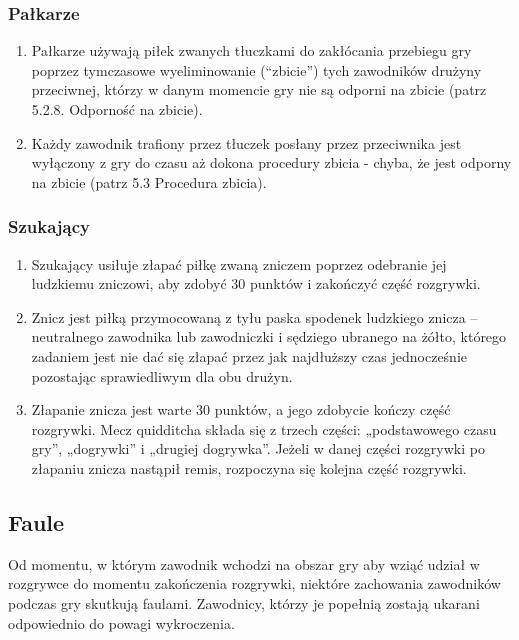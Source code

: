 \documentclass[12pt]{article}
\begin{document}
\subsubsection{Pałkarze}
\begin{enumerate}
	\item Pałkarze używają piłek zwanych tłuczkami do zakłócania przebiegu gry
	      poprzez tymczasowe wyeliminowanie (``zbicie'') tych zawodników drużyny
	      przeciwnej, którzy w danym momencie gry nie są odporni na zbicie (patrz
	      5.2.8. Odporność na zbicie).

	\item Każdy zawodnik trafiony przez tłuczek posłany przez przeciwnika jest
	      wyłączony z gry do czasu aż dokona procedury zbicia - chyba, że jest
	      odporny na zbicie (patrz 5.3 Procedura zbicia).
\end{enumerate}

\subsubsection{Szukający}
\begin{enumerate}
	\item Szukający usiłuje złapać piłkę zwaną zniczem poprzez odebranie jej
	      ludzkiemu zniczowi, aby zdobyć 30 punktów i zakończyć część rozgrywki.

	\item Znicz jest piłką przymocowaną z tyłu paska spodenek ludzkiego znicza
	      -- neutralnego zawodnika lub zawodniczki i sędziego ubranego na żółto,
	      którego zadaniem jest nie dać się złapać przez jak najdłuższy czas
	      jednocześnie pozostając sprawiedliwym dla obu drużyn.

	\item Złapanie znicza jest warte 30 punktów, a jego zdobycie kończy część
	      rozgrywki. Mecz quidditcha składa się z trzech części: „podstawowego
	      czasu gry'', „dogrywki'' i „drugiej dogrywka''. Jeżeli w danej części
	      rozgrywki po złapaniu znicza nastąpił remis, rozpoczyna się kolejna
	      część rozgrywki.
\end{enumerate}

\subsection{Faule}
Od momentu, w którym zawodnik wchodzi na obszar gry aby wziąć udział w
rozgrywce do momentu zakończenia rozgrywki, niektóre zachowania
zawodników podczas gry skutkują faulami. Zawodnicy, którzy je popełnią
zostają ukarani odpowiednio do powagi wykroczenia.
\end{document}
